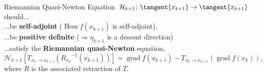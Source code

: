 \documentclass[9.4pt]{beamer}
\begin{document}

\begin{frame}{Riemannian Quasi-Newton Equation}
    $\mathcal{H}_{k+1} \colon \tangent{x_{k+1}} \to \tangent{x_{k+1}}$ should... \\[0.5\baselineskip]
    ...be \textbf{self-adjoint} ($\operatorname{Hess} f(x_{k+1})$ is self-adjoint), \\[0.5\baselineskip]
    ...be \textbf{positive definite} ($\Rightarrow \eta_{k+1}$ is a descent direction) \\[0.5\baselineskip]
    ...satisfy the \textbf{Riemannian quasi-Newton} equation, 
    \begin{equation*}
            \mathcal{H}_{k+1} [T_{x_k \rightarrow x_{k+1}}({R_{x_k}}^{-1}(x_{k+1}))] = \operatorname{grad} f(x_{k+1}) - T_{x_k \rightarrow x_{k+1}}(\operatorname{grad} f(x_k)),
    \end{equation*} 
    where $R$ is the associated retraction of $T$.
\end{frame}
\end{document}
